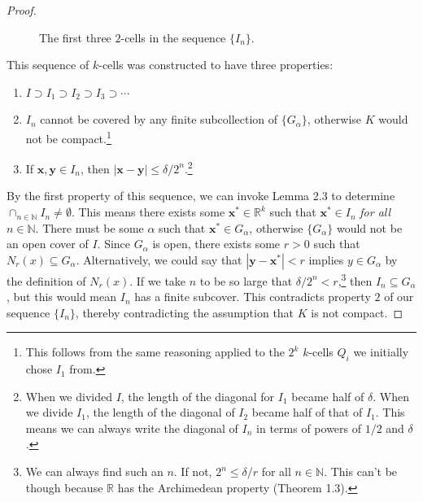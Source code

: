 \documentclass{article}
\newcommand{\N}{\mathbb{N}}
\newcommand{\R}{\mathbb{R}}
\newcommand{\x}{\mathbf{x}}
\newcommand{\y}{\mathbf{y}}
\theoremstyle{definition}
\begin{document}
\begin{proof}
\begin{figure}[h!]
			\caption{The first three $ 2 $-cells in the sequence $ \{I_n\} $.}
		\end{figure}
		This sequence of $ k $-cells was constructed to have three properties:
		\begin{enumerate}
			\item $ I\supset I_1\supset I_2\supset I_3\supset\cdots $
			\item $ I_n $ cannot be covered by any finite subcollection of $ \{G_\alpha\} $, otherwise $ K $ would not be compact.\footnote{This follows from the same reasoning applied to the $ 2^k $ $ k $-cells $ Q_i $ we initially chose $ I_1 $ from.}
			\item If $ \x,\y\in I_n $, then $ |\x-\y|\le \delta/2^n $.\footnote{When we divided $ I $, the length of the diagonal for $ I_1 $ became half of $ \delta $. When we divide $ I_1 $, the length of the diagonal of $ I_2 $ became half of that of $ I_1 $. This means we can always write the diagonal of $ I_n $ in terms of powers of $ 1/2 $ and $ \delta $.  }
		\end{enumerate}
		By the first property of this sequence, we can invoke Lemma 2.3 to determine $ \cap_{n\in\N} I_n\neq\emptyset $. This means there exists some $ \x^*\in\R^k $ such that $ \x^*\in I_n $ \textit{for all} $ n\in\N $. There must be some $ \alpha $ such that $ \x^*\in G_\alpha $, otherwise $ \{G_\alpha\} $ would not be an open cover of $ I $. Since $ G_\alpha $ is open, there exists some $ r>0 $ such that $ N_r(x)\subseteq G_\alpha $. Alternatively, we could say that $ |\y-\x^*|<r $ implies $ y\in G_\alpha $ by the definition of $ N_r(x) $. If we take $ n $ to be so large that $ \delta/2^n<r $,\footnote{We can always find such an $ n $. If not, $ 2^n\le\delta /r $ for all $ n \in\N$. This can't be though because $ \R $ has the Archimedean property (Theorem 1.3).} then $ I_n\subseteq G_\alpha $, but this would mean $ I_n $ has a finite subcover. This contradicts property $ 2 $ of our sequence $ \{I_n\} $, thereby contradicting the assumption that $ K $ is not compact. 
	\end{proof}
\end{document}
